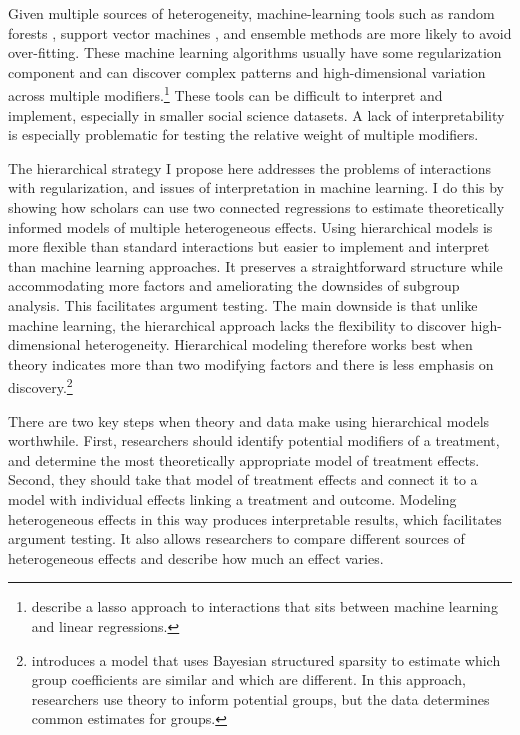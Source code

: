 \documentclass[12pt]{article}
\begin{document}
Given multiple sources of heterogeneity, machine-learning tools such as random forests \citep{GreenKern2012, WagerAthey2018}, support vector machines \citep{ImaiRatkovic2013}, and ensemble methods \citep{Grimmeretal2017, Kuenzeletal2019, Dorieetal2022} are more likely to avoid over-fitting.
These machine learning algorithms usually have some regularization component and can discover complex patterns and high-dimensional variation across multiple modifiers.\footnote{\citet{BlackwellOlson2022} describe a lasso approach to interactions that sits between machine learning and linear regressions.}
These tools can be difficult to interpret and implement, especially in smaller social science datasets. 
A lack of interpretability is especially problematic for testing the relative weight of multiple modifiers. 


The hierarchical strategy I propose here addresses the problems of interactions with regularization, and issues of interpretation in machine learning.
I do this by showing how scholars can use two connected regressions to estimate theoretically informed models of multiple heterogeneous effects.
Using hierarchical models is more flexible than standard interactions but easier to implement and interpret than machine learning approaches.  
It preserves a straightforward structure while accommodating more factors and ameliorating the downsides of subgroup analysis. 
This facilitates argument testing.
The main downside is that unlike machine learning, the hierarchical approach lacks the flexibility to discover high-dimensional heterogeneity.  
Hierarchical modeling therefore works best when theory indicates more than two modifying factors and there is less emphasis on discovery.\footnote{\citet{Goplerud2021} introduces a model that uses Bayesian structured sparsity to estimate which group coefficients are similar and which are different. In this approach, researchers use theory to inform potential groups, but the data determines common estimates for groups.} 


There are two key steps when theory and data make using hierarchical models worthwhile.
First, researchers should identify potential modifiers of a treatment, and determine the most theoretically appropriate model of treatment effects. 
Second, they should take that model of treatment effects and connect it to a model with individual effects linking a treatment and outcome.
Modeling heterogeneous effects in this way produces interpretable results, which facilitates argument testing.
It also allows researchers to compare different sources of heterogeneous effects and describe how much an effect varies.  
\end{document}
